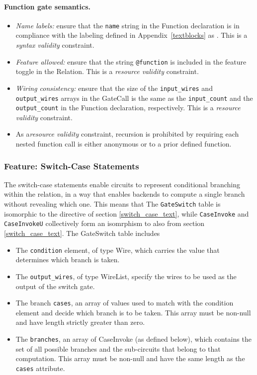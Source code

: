 \paragraph{Function gate semantics.}
\begin{itemize}
    \item \textit{Name labels:} ensure that the \texttt{name} string in the \textsf{Function} declaration is in compliance with the labeling defined in Appendix~\ref{textblocks} as . This is a \textit{syntax validity} constraint.
    \item \textit{Feature allowed:} ensure that the string \texttt{@function} is included in the feature toggle in the \textsf{Relation}. This is a \textit{resource validity} constraint.
    \item \textit{Wiring consistency:} ensure that the size of the \texttt{input\_wires} and \texttt{output\_wires} arrays in the \textsf{GateCall} is the same as the \texttt{input\_count} and the \texttt{output\_count} in the \textsf{Function} declaration, respectively. This is a \textit{resource validity} constraint. 
    \item As a\textit{resource validity} constraint, recursion is prohibited by requiring each nested function call is either anonymous or to a prior defined function.
\end{itemize}

\subsubsection{Feature: Switch-Case Statements}\label{sec:switch-gate}
The switch-case statements enable circuits to represent conditional branching within the relation, in a way that enables backends to compute a single branch without revealing which one. This means that 
The \texttt{GateSwitch} table is isomorphic to the  directive of section \ref{switch_case_text}, while \texttt{CaseInvoke} and \texttt{CaseInvokeU} collectively form an isomrphism to  also from section \ref{switch_case_text}. The \textsf{GateSwitch} table includes
\begin{itemize}
    \item The \texttt{condition} element, of type \textsf{Wire}, which carries the value that determines which branch is taken.
    \item The \texttt{output\_wires}, of type \textsf{WireList}, specify the wires to be used as the output of the switch gate.
    \item The branch \texttt{cases}, an array of values used to match with the condition element and decide which branch is to be taken. This array must be non-null and have length strictly greater than zero.
    \item The \texttt{branches}, an array of \textsf{CaseInvoke} (as defined below), which contains the set of all possible branches and the sub-circuits that belong to that computation. This array must be non-null and have the same length as the \texttt{cases} attribute.
\end{itemize}

